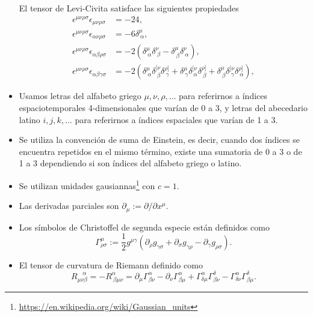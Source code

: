 \begin{itemize}
El tensor de Levi-Civita satisface las siguientes propiedades
\begin{align*}
\epsilon^{\mu \nu \rho \sigma} \epsilon_{\mu \nu \rho \sigma} &= -24,\\
\epsilon^{\mu \nu \rho \sigma} \epsilon_{\alpha \nu \rho \sigma} &= -6 \delta^{\mu}_{\ \alpha},\\
\epsilon^{\mu \nu \rho \sigma} \epsilon_{\alpha \beta \rho \sigma} &= -2 \left( \delta^{\mu}_{\ \alpha} \delta^{\nu}_{\ \beta} - \delta^{\mu}_{\ \beta} \delta^{\nu}_{\ \alpha} \right),\\
\epsilon^{\mu \nu \rho \sigma} \epsilon_{\alpha \beta \gamma \sigma} &= - 2\left( \delta^{\mu}_{\ \alpha}\delta^{[\nu}_{\ \beta}\delta^{\rho]}_{\ \gamma} + \delta^{\mu}_{\ \gamma}\delta^{[\nu}_{\ \alpha}\delta^{\rho]}_{\ \beta} + \delta^{\mu}_{\ \beta}\delta^{[\nu}_{\ \gamma}\delta^{\rho]}_{\ \alpha} \right),
\end{align*}
\item Usamos letras del alfabeto griego $\mu, \nu, \rho, \dots$ para referirnos a índices espaciotemporales 4-dimensionales que varían de 0 a 3, y letras del abecedario latino $i, j, k, \dots$ para referirnos a índices espaciales que varían de 1 a 3.
\item Se utiliza la convención de suma de Einstein, es decir, cuando dos índices se encuentra repetidos en el mismo término, existe una sumatoria de 0 a 3 o de 1 a 3 dependiendo si son índices del alfabeto griego o latino.
\item Se utilizan unidades gausiannas\footnote{\url{https://en.wikipedia.org/wiki/Gaussian_units}} con $c=1$.
\item Las derivadas parciales son $\partial_{\mu} := \partial / \partial x^{\mu}$.
\item Los símbolos de Christoffel de segunda especie están definidos como
\begin{equation}
\Gamma^{\mu}_{\rho \sigma} := \frac{1}{2} g^{\mu \gamma} \left( \partial_{\rho} g_{\gamma \sigma} + \partial_{\sigma} g_{\gamma \rho} - \partial_{\gamma} g_{\rho \sigma} \right).
\end{equation}
\item El tensor de curvatura de Riemann definido como 
\begin{equation}
R_{\mu \nu \beta}^{\ \ \ \ \alpha} =-R^{\alpha}_{\ \beta \mu \nu} = \partial_{\mu} \Gamma^{\alpha}_{\beta \nu} - \partial_{\nu} \Gamma^{\alpha}_{\beta \mu} + \Gamma^{\alpha}_{\delta \mu} \Gamma^{\delta}_{\beta \nu} - \Gamma^{\alpha}_{\delta \nu} \Gamma^{\delta}_{\beta \mu}.

\end{equation}
\end{itemize}
